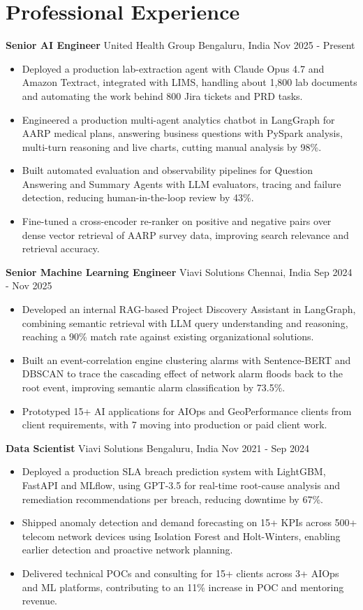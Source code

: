 \documentclass[10pt,a4paper]{article}
\newcommand{\role}[4]{\textbf{#1} \textbar{} #2 \hfill #3 \textbar{} #4\par}
\begin{document}
\section{Professional Experience}
\role{Senior AI Engineer}{United Health Group}{Bengaluru, India}{Nov 2025 - Present}
\begin{itemize}
  \item Deployed a production lab-extraction agent with Claude Opus 4.7 and Amazon Textract, integrated with LIMS, handling about 1,800 lab documents and automating the work behind 800 Jira tickets and PRD tasks.
  \item Engineered a production multi-agent analytics chatbot in LangGraph for AARP medical plans, answering business questions with PySpark analysis, multi-turn reasoning and live charts, cutting manual analysis by 98\%.
  \item Built automated evaluation and observability pipelines for Question Answering and Summary Agents with LLM evaluators, tracing and failure detection, reducing human-in-the-loop review by 43\%.
  \item Fine-tuned a cross-encoder re-ranker on positive and negative pairs over dense vector retrieval of AARP survey data, improving search relevance and retrieval accuracy.
\end{itemize}
\vspace{3pt}
\role{Senior Machine Learning Engineer}{Viavi Solutions}{Chennai, India}{Sep 2024 - Nov 2025}
\begin{itemize}
  \item Developed an internal RAG-based Project Discovery Assistant in LangGraph, combining semantic retrieval with LLM query understanding and reasoning, reaching a 90\% match rate against existing organizational solutions.
  \item Built an event-correlation engine clustering alarms with Sentence-BERT and DBSCAN to trace the cascading effect of network alarm floods back to the root event, improving semantic alarm classification by 73.5\%.
  \item Prototyped 15+ AI applications for AIOps and GeoPerformance clients from client requirements, with 7 moving into production or paid client work.
\end{itemize}
\vspace{3pt}
\role{Data Scientist}{Viavi Solutions}{Bengaluru, India}{Nov 2021 - Sep 2024}
\begin{itemize}
  \item Deployed a production SLA breach prediction system with LightGBM, FastAPI and MLflow, using GPT-3.5 for real-time root-cause analysis and remediation recommendations per breach, reducing downtime by 67\%.
  \item Shipped anomaly detection and demand forecasting on 15+ KPIs across 500+ telecom network devices using Isolation Forest and Holt-Winters, enabling earlier detection and proactive network planning.
  \item Delivered technical POCs and consulting for 15+ clients across 3+ AIOps and ML platforms, contributing to an 11\% increase in POC and mentoring revenue.
\end{itemize}
\end{document}
